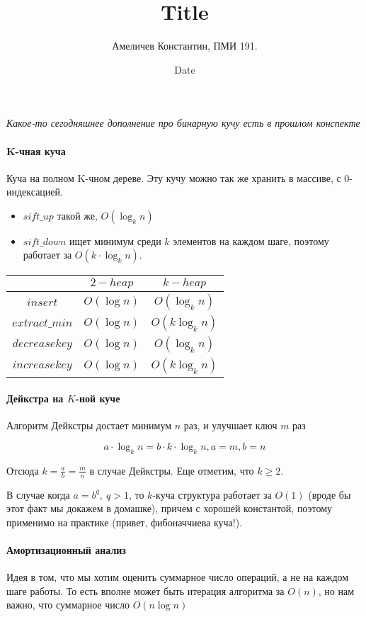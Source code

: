 \documentclass[12pt]{article}
\title{Title}
\author{Амеличев Константин, ПМИ 191.}
\date{Date}
\begin{document}
\textit{Какое-то сегодняшнее дополнение про бинарную кучу есть в прошлом конспекте}
\paragraph{K-чная куча}

Куча на полном K-чном дереве. Эту кучу можно так же хранить в массиве, с 0-индексацией.
\begin{itemize}
    \item $sift\_up$ такой же, $O(\log_k n)$
    \item $sift\_down$ ищет минимум среди $k$ элементов на каждом шаге, поэтому работает за $O(k \cdot \log_k n)$.
\end{itemize}

\begin{tabular}{c|c|c}
 & $2-heap$ & $k-heap$ \\
 \hline
 $insert$ & $O(\log n)$ & $O(\log_k n)$ \\
 \hline
 $extract\_min$ & $O(\log n)$ & $O(k \log_k n)$ \\
 \hline
 $decrease key$ & $O(\log n)$ & $O(\log_k n)$ \\
 \hline
 $increase key$ & $O(\log n)$ & $O(k \log_k n)$ \\
 \hline
\end{tabular}

\paragraph{Дейкстра на $K$-ной куче}

Алгоритм Дейкстры достает минимум $n$ раз, и улучшает ключ $m$ раз

$$ a \cdot \log_k n = b \cdot k \cdot \log_k n, a = m, b = n$$

Отсюда $k = \frac{a}{b} = \frac{m}{n}$ в случае Дейкстры. Еще отметим, что $k \ge 2$.

В случае когда $a = b^q,\ q > 1$, то $k$-куча структура работает за $O(1)$ (вроде бы этот факт мы докажем в домашке), причем с хорошей константой, поэтому применимо на практике (привет, фибоначчиева куча!).

\paragraph{Амортизационный анализ}

Идея в том, что мы хотим оценить суммарное число операций, а не на каждом шаге работы. То есть вполне может быть итерация алгоритма за $O(n)$, но нам важно, что суммарное число $O(n \log n)$
\end{document}
